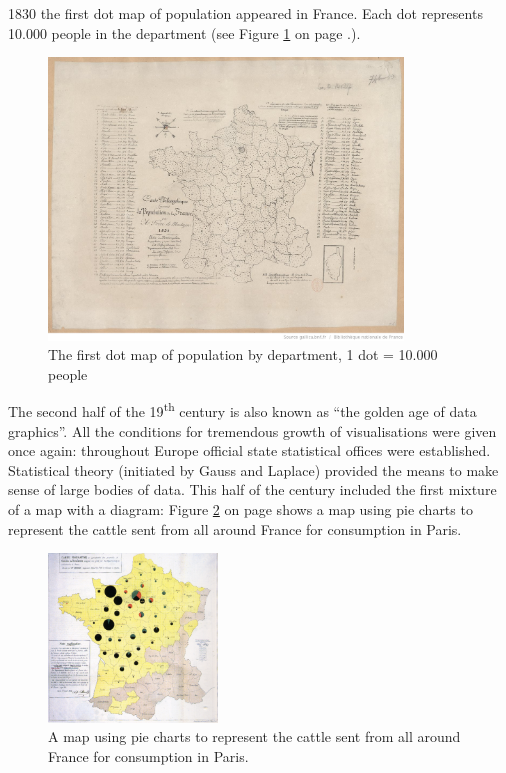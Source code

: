 1830 the first dot map of population appeared in France. Each dot represents 10.000 people in the department (see Figure \ref{fig:first-dotmap} on page \pageref{fig:first-dotmap}.).

\begin{figure}[!htb]
\centering
\includegraphics[height=7.5cm,keepaspectratio]{images/history/montizon-dotmap2.jpeg}
\caption[
    The first dot map of population by department, 1 dot = 10.000 people, Urldate: 07.2016 \newline
\small\texttt{\url{http://gallica.bnf.fr/ark:/12148/btv1b8492261j/f1.highres}}
]{The first dot map of population by department, 1 dot = 10.000 people}
\label{fig:first-dotmap}
\end{figure}

The second half of the 19\textsuperscript{th} century is also known as ``the golden age of data graphics''. All the conditions for tremendous growth of visualisations were given once again: throughout Europe official state statistical offices were established.
Statistical theory (initiated by Gauss and Laplace) provided the means to make sense of large bodies of data.
This half of the century included the first mixture of a map with a diagram: Figure \ref{fig:first-mixture} on page \pageref{fig:first-mixture} shows a map using pie charts to represent the cattle sent from all around France for consumption in Paris.

\begin{figure}[!htb]
\centering
\includegraphics[width=0.4\textwidth,keepaspectratio]{images/history/minard.png}
\caption[
    A map using pie charts to represent the cattle sent from all around France for consumption in Paris., Urldate: 07.2016 \newline
\small\texttt{\url{https://upload.wikimedia.org/wikipedia/commons/1/1c/Minard-carte-viande-1858.png}}
]{A map using pie charts to represent the cattle sent from all around France for consumption in Paris.}
\label{fig:first-mixture}
\end{figure}

